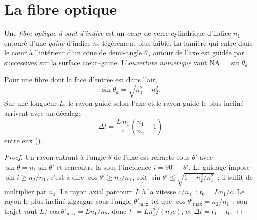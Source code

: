 \section{La fibre optique}

\begin{definition}\label{def:b1:rays-reflection-refraction:fiber}
Une \emph{fibre optique à saut d'indice} est un \emph{cœur} de verre
cylindrique d'indice $n_1$ entouré d'une \emph{gaine} d'indice $n_2$
légèrement plus faible. La lumière qui entre dans le cœur à l'intérieur
d'un cône de demi-angle $\theta_a$ autour de l'axe est guidée par
 successives sur la surface cœur--gaine.
L'\emph{ouverture numérique} vaut $\mathrm{NA} = \sin\theta_a$.
\end{definition}

\begin{proposition}\label{prop:b1:rays-reflection-refraction:fiber}
Pour une fibre dont la face d'entrée est dans l'air,
\[
\sin\theta_a = \sqrt{n_1^2 - n_2^2} .
\]
Sur une longueur $L$, le rayon guidé selon l'axe et le rayon guidé le
plus incliné arrivent avec un décalage
\[
\Delta t = \frac{L\,n_1}{c}\left(\frac{n_1}{n_2} - 1\right)
\]
entre eux (\emph{}).
\end{proposition}

\begin{proof}
Un rayon entrant à l'angle $\theta$ de l'axe est réfracté sous $\theta'$
avec $\sin\theta = n_1\sin\theta'$ et rencontre la  sous
l'incidence $i = 90^\circ - \theta'$. Le guidage impose
$\sin i \geq n_2/n_1$, c'est-à-dire $\cos\theta' \geq n_2/n_1$, soit
$\sin\theta' \leq
\sqrt{1 - n_2^2/n_1^2}$~; il suffit de multiplier par $n_1$. Le rayon
axial parcourt $L$ à la vitesse $c/n_1$~: $t_0 = Ln_1/c$. Le rayon le
plus incliné zigzague sous l'angle $\theta'_{\max}$ tel que
$\cos\theta'_{\max} = n_2/n_1$~; son trajet vaut
$L/\cos\theta'_{\max} = L n_1/n_2$, donc $t_1 = L n_1^2/(n_2 c)$, et
$\Delta t = t_1 - t_0$.
\end{proof}


